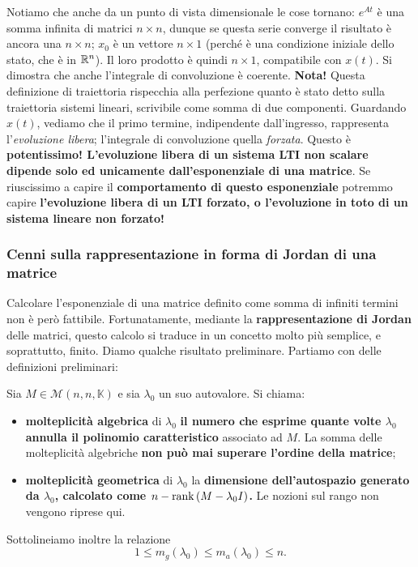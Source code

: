 \documentclass[a4paper]{report}
\begin{document}
Notiamo che anche da un punto di vista dimensionale le cose tornano: $e^{At}$ è una somma infinita di matrici $n \times n$, dunque se questa serie converge il risultato è ancora una $n \times n$; $x_0$ è un vettore $n \times 1$ (perché è una condizione iniziale dello stato, che è in $\mathbb{R}^n$). Il loro prodotto è quindi $n \times 1$, compatibile con $x(t)$. Si dimostra che anche l'integrale di convoluzione è coerente.
\bb
\textbf{Nota!} Questa definizione di traiettoria rispecchia alla perfezione quanto è stato detto sulla traiettoria sistemi lineari, scrivibile come somma di due componenti. Guardando $x(t)$, vediamo che il primo termine, indipendente dall'ingresso, rappresenta l'\textit{evoluzione libera}; l'integrale di convoluzione quella \textit{forzata}. Questo è \textbf{potentissimo! L'evoluzione libera di un sistema LTI non scalare dipende solo ed unicamente dall'esponenziale di una matrice}. Se riuscissimo a capire il \textbf{comportamento di questo esponenziale} potremmo capire \textbf{l'evoluzione libera di un LTI forzato, o l'evoluzione in toto di un sistema lineare non forzato!}
\subsubsection{Cenni sulla rappresentazione in forma di Jordan di una matrice}
Calcolare l'esponenziale di una matrice definito come somma di infiniti termini non è però fattibile. Fortunatamente, mediante la \textbf{rappresentazione di Jordan} delle matrici, questo calcolo si traduce in un concetto molto più semplice, e soprattutto, finito. Diamo qualche risultato preliminare.
Partiamo con delle definizioni preliminari:
\begin{prop}
	Sia $M \in \mathcal{M}(n,n,\mathbb{K})$ e sia $\lambda_0$ un suo autovalore. Si chiama:
	\begin{itemize}
		\item \textbf{molteplicità algebrica} di $\lambda_0$  \rarr \textbf{il numero che esprime quante volte $\lambda_0$ annulla il polinomio caratteristico} associato ad $M$. La somma delle molteplicità algebriche \textbf{non può mai superare l'ordine della matrice};
		\item \textbf{molteplicità geometrica} di $\lambda_0$ \rarr la \textbf{dimensione dell'autospazio generato da $\lambda_0$, calcolato come $n - \rank{(M-\lambda_0 I)}$.} Le nozioni sul rango non vengono riprese qui.
	\end{itemize}
	Sottolineiamo inoltre la relazione
\begin{equation}
		1 \leq m_g(\lambda_0) \leq m_a(\lambda_0)\leq n.
	\end{equation} 
\end{prop}
\end{document}
